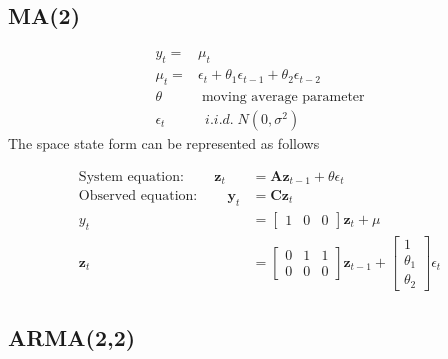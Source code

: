 \documentclass[11pt]{article}
\begin{document}
\subsection{MA(2)}

 \begin{align*}
    y_t =& \mu_t  \\
    \mu_t =& \epsilon_t  +\theta_1\epsilon_{t-1} + \theta_2\epsilon_{t-2} \\
     \theta & \; \text{moving average parameter} \\
    \epsilon_t & \; ~ i.i.d. \; N(0,\sigma^2) 
\end{align*}
The space state form can be represented as follows

\begin{align*}
    \text{System equation}: \qquad \mathbf{z}_t & = \mathbf{A} \mathbf{z}_{t-1}+ \theta \epsilon_t \\
    \text{Observed equation}: \qquad \mathbf{y}_t & = \mathbf{C} \mathbf{z}_t \\
        y_t & = 
    \begin{bmatrix}
     1 & 0 & 0 
\end{bmatrix}
\mathbf{z}_t +  
\mu \\
\mathbf{z}_t & = \begin{bmatrix}
 0 & 1 & 1\\
 0 & 0 & 0
\end{bmatrix}
\mathbf{z}_{t-1} + \begin{bmatrix}
 1 \\
 \theta_1 \\
 \theta_2 
\end{bmatrix} \epsilon_t
\end{align*}

\subsection{ARMA(2,2)}
\end{document}
